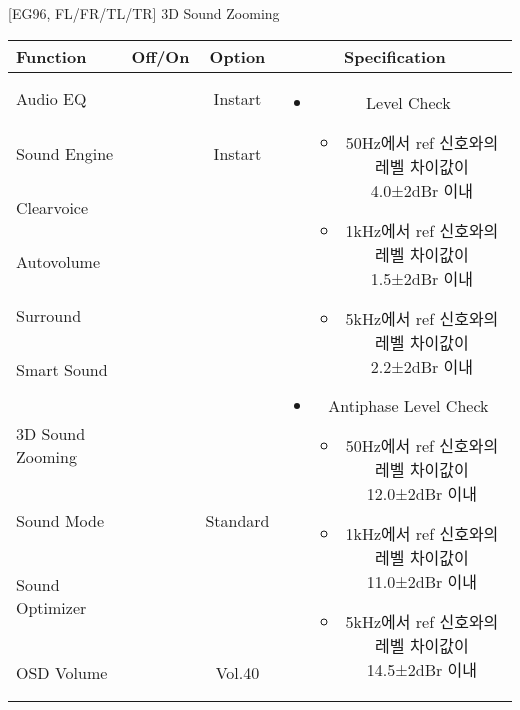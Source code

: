\begin{frame}[t]{[EG96, FL/FR/TL/TR] 3D Sound Zooming}
\begin{tiny}
\begin{tabular}{@{}lccc@{}}
\toprule
Function & Off/On & Option & Specification \\
\midrule
Audio EQ & \color{black}{Off} & Instart &
\multirow{10}{60mm}{
\begin{itemize}
\item Level Check
	\begin{itemize}
	\item 50Hz에서 ref 신호와의 레벨 차이값이 4.0±2dBr 이내
	\item 1kHz에서 ref 신호와의 레벨 차이값이 1.5±2dBr 이내
	\item 5kHz에서 ref 신호와의 레벨 차이값이 2.2±2dBr 이내
	\end{itemize}
\item Antiphase Level Check
	\begin{itemize}	
	\item 50Hz에서 ref 신호와의 레벨 차이값이 12.0±2dBr 이내
	\item 1kHz에서 ref 신호와의 레벨 차이값이 11.0±2dBr 이내
	\item 5kHz에서 ref 신호와의 레벨 차이값이 14.5±2dBr 이내
	\end{itemize}
\end{itemize}
} \\
Sound Engine & \color{blue}{On} & Instart & \\
Clearvoice & \color{black}{Off} & & \\
Autovolume & \color{black}{Off} & & \\
Surround & \color{black}{Off} & & \\
Smart Sound & \color{black}{Off} & & \\
3D Sound Zooming & \color{blue}{On} & & \\
Sound Mode & \color{blue}{On} & Standard & \\
Sound Optimizer & \color{black}{Off} & & \\
OSD Volume & \color{blue}{On} & Vol.40 & \\
\midrule
\end{tabular}
\end{tiny}

\end{frame}


